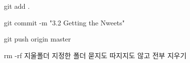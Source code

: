 git add .

git commit -m "3.2 Getting the Nweets"

git push origin master

rm -rf 지울폴더
지정한 폴더 묻지도 따지지도 않고 전부 지우기